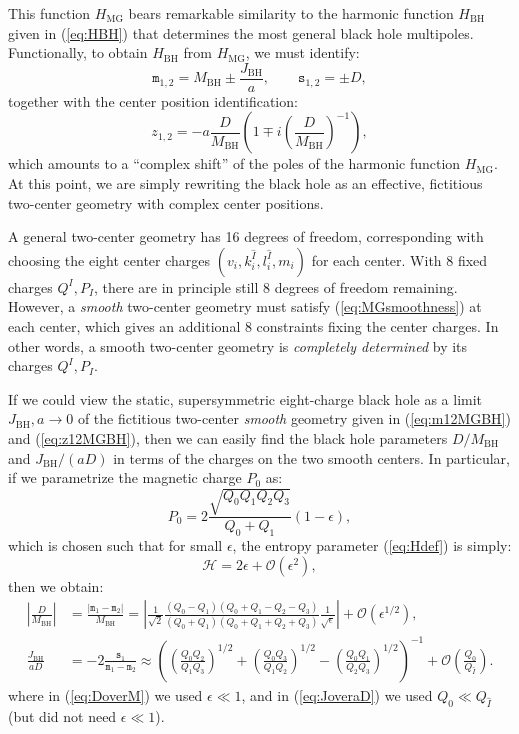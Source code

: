 \documentclass[12pt,a4paper]{article}
\newcommand{\be}{\begin{equation}}
\newcommand{\ee}{\end{equation}}
\newcommand{\mm}{\mathtt{m}}
\newcommand{\sm}{\mathtt{s}}
\begin{document}
This function $H_\text{MG}$ bears remarkable similarity to the harmonic function $H_\text{BH}$ given in (\ref{eq:HBH}) that determines the most general black hole multipoles. Functionally, to obtain $H_\text{BH}$ from $H_\text{MG}$, we must identify:
\be \label{eq:m12MGBH} \mm_{1,2} = M_\text{BH} \pm \frac{J_\text{BH}}{a}, \qquad \sm_{1,2} = \pm D,\ee
together with the center position identification:
\be \label{eq:z12MGBH} z_{1,2} = -a\frac{D}{M_\text{BH}} \left( 1 \mp i \left(\frac{D}{M_\text{BH}}\right)^{-1} \right), \ee
which amounts to a ``complex shift'' of the poles of the harmonic function $H_\text{MG}$.
At this point, we are simply rewriting the black hole as an effective, fictitious two-center geometry with complex center positions.

A general two-center geometry has 16 degrees of freedom, corresponding with choosing the eight center charges $(v_i, k^{\hat{I}}_i,l^{\hat{I}}_i, m_i)$ for each center. With 8 fixed charges $Q^I, P_I$, there are in principle still 8 degrees of freedom remaining. However, a \emph{smooth} two-center geometry must satisfy (\ref{eq:MGsmoothness}) at each center, which gives an additional 8 constraints fixing the center charges. In other words, a smooth two-center geometry is \emph{completely determined} by its charges $Q^I, P_I$.

If we could view the static, supersymmetric eight-charge black hole as a limit $J_\text{BH},a\rightarrow 0$ of the fictitious two-center \emph{smooth} geometry given in (\ref{eq:m12MGBH}) and (\ref{eq:z12MGBH}), then we can easily find the black hole parameters $D/M_\text{BH}$ and $J_\text{BH}/(aD)$ in terms of the charges on the two smooth centers. In particular, if we parametrize the magnetic charge $P_0$ as:
\be \label{eq:P0parameps} P_0 = 2 \frac{\sqrt{Q_0 Q_1 Q_2 Q_3}}{Q_0+Q_1}(1-\epsilon),\ee
which is chosen such that for small $\epsilon$, the entropy parameter (\ref{eq:Hdef}) is simply:
\be \label{eq:Hparameps} \mathcal{H} = 2\epsilon + \mathcal{O}(\epsilon^2),\ee
then we obtain:
\begin{align} \label{eq:DoverM} \left|\frac{D}{M_\text{BH}}\right|& = \frac{ |\mm_1-\mm_2|}{M_\text{BH}} =   \left| \frac{1}{\sqrt{2}}\frac{(Q_0 - Q_1)(Q_0 + Q_1 -Q_2-Q_3)}{(Q_0+Q_1)(Q_0+Q_1+Q_2+Q_3)} \frac{1}{\sqrt{\epsilon}}\right| + \mathcal{O}(\epsilon^{1/2}),\\
 \label{eq:JoveraD}  \frac{J_\text{BH}}{aD} &= -2\frac{\sm_1}{\mm_1-\mm_2} \approx  \left( \left( \frac{Q_0 Q_2}{Q_1 Q_3}\right)^{1/2}+\left(\frac{Q_0 Q_3}{Q_1 Q_2}\right)^{1/2}-\left(\frac{Q_0 Q_1}{Q_2 Q_3}\right)^{1/2}\right)^{-1} + \mathcal{O}\left(\frac{Q_0}{Q_{\hat{I}}}\right).
\end{align}
where in (\ref{eq:DoverM}) we used $\epsilon\ll 1$, and in (\ref{eq:JoveraD}) we used $Q_0\ll Q_{\hat{I}}$ (but did not need $\epsilon\ll 1$).
\end{document}
